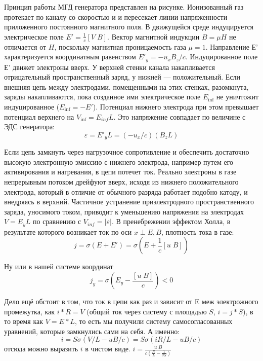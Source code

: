 \documentclass[10pt, a4paper]{article}
\begin{document}
Принцип работы МГД генератора представлен на рисунке. Ионизованный газ протекает по каналу со скоростью и и пересекает линии напряженности приложенного постоянного магнитного поля. В движущейся среде индуцируется электрическое поле $E' =\frac{1}{c} [V\; B]$. Вектор магнитной индукции $B =\mu H$ не отличается от $H$, поскольку магнитная проницаемость газа $\mu=1$. Направление Е' характеризуется  
координатным равенством $E'_y=-u_x B_z / c $. Индуцированное поле Е' движет электроны вверх. У верхней  
стенки канала накапливается отрицательный пространственный заряд, у нижней — положительный. Если внешняя цепь между электродами, помещенными на этих стенках, разомкнута, заряды накапливаются, пока созданное ими электрическое поле $E_{\inf}$ не уничтожит индуцированное ($E_{\inf}=-E'$). Потенциал нижнего электрода при этом превышает потенциал верхнего на $V_{\inf} = E_{inf} L$. Это напряжение совпадает по величине с ЭДС генератора:
\begin{equation}
	\varepsilon=E'_{y}L=(-u_x /c)(B_z L)
\end{equation}

Если цепь замкнуть через нагрузочное сопротивление и обеспечить достаточно высокую электронную эмиссию с нижнего электрода, например путем его активирования и нагревания, в цепи потечет ток. Реально электроны в газе непрерывным потоком дрейфуют вверх, исходя из нижнего положительного электрода, который в отличие от обычного разряда работает подобно катоду, и внедряясь в верхний. Частичное устранение приэлектродного пространственного заряда, уносимого током, приводит к уменьшению напряжения на электродах $V= E_{y} L$ по сравнению с $V_{inf}=|\varepsilon|$. В пренебрежении эффектом Холла, в результате которого возникает ток по оси $x \perp E, B$, плотность тока в газе:
\begin{equation}
	j=\sigma(E+E')=\sigma(E+\frac{1}{c}[u\;B])
\end{equation}

Ну или в нашей системе координат 
\begin{equation}
	j_y=\sigma(E_y-\frac{[u\;B]}{c}) <0
\end{equation}

Дело ещё обстоит в том, что ток в цепи как раз и зависит от E меж электрожного промежутка, как $i*R=V$ (общий ток через систему с площадью $S$, $i=j*S$), в то время как $V=E*L$, то есть мы получили систему самосогласованных уравнений, которые замкнулись сами на себя. А именно:
\begin{equation}
	i=S \sigma(V/L-uB/c)=S \sigma(iR/L-uB/c)
\end{equation}
отсюда можно выразить $i$ в чистом виде. $i=\frac{u\;B}{c(\frac{R}{L}-\frac{1}{\sigma S})}$
\end{document}

